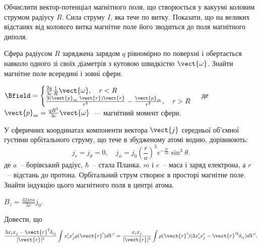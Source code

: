 \begin{problem}
Обчислити вектор-потенціал магнітного поля, що створюється у вакуумі коловим струмом радіусу $R$. Сила струму $I$, яка тече по витку. Показати, що на великих відстанях від колового витка магнітне поле його зводиться до поля магнітного диполя.
\end{problem}

\begin{problem}
Сфера радіусом $R$ заряджена зарядом $q$ рівномірно по поверхні і обертається навколо одного зі своїх діаметрів з кутовою швидкістю $\vect{\omega}$. Знайти магнітне поле всередині і зовні сфери.
\begin{solution}
	$\Bfield =
		\begin{cases}
			\frac{2q}{3c}\frac1R\vect{\omega}, \quad r < R \\
			\frac{3(\vect{p}_m \cdot \vect{r})\vect{r}}{r^5} - \frac{\vect{p}_m}{r^3}, \quad r > R
		\end{cases}
	$
	де $\vect{p}_m = \frac{qR^2}{3c}\vect{\omega}$~--- магнітний момент сфери.
\end{solution}
\end{problem}

\begin{problem}%
У сферичних координатах компоненти вектора $\vect{j}$ середньої об'ємної густини орбітального струму, що тече в збудженому атомі водню, дорівнюють:
\[
	j_r = j_{\theta} = 0, \quad
	j_{\phi} = j_0\left( \frac{r}{a}\right)^3 e^{-\frac{2r}{3a}}\sin^3\theta.
\]
де $a$~-- борівський радіус, $\hbar$~-- стала Планка, $m$ і $e$~-- маса і заряд електрона, а $r$~--
відстань до протона. Орбітальний струм створює в просторі магнітне поле. Знайти індукцію цього
магнітного поля в центрі атома.
\begin{solution}
	$B_z = \frac{324\pi a}{5c}j_0$.
\end{solution}
\end{problem}

\begin{problem}
    Довести, що
    \[
        \frac{3x_ix_j -\vect{r}^2\delta_{ij}}{|\vect{r}|^5}\int x_i'x_j' \rho(\vect{r}')dV' = \frac{x_ix_j}{|\vect{r}|^5} \int\rho(\vect{r}')(3x'_ix'_j -\vect{r}^{\prime2}\delta_{ij})dV'.
    \]
\end{problem}

